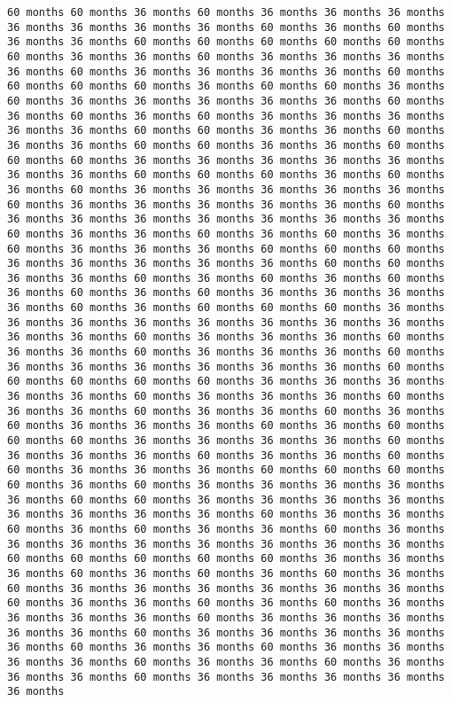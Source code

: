 \documentclass[11pt]{article}
\begin{document}
\begin{Verbatim}[commandchars=\\\{\}, frame=single, framerule=2mm, rulecolor=\color{outerrorbackground}]
60 months 60 months 36 months 60 months 36 months 36 months 36 months 36 months 36 months 36 months 36 months 60 months 36 months 60 months 36 months 36 months 60 months 60 months 60 months 60 months 60 months 60 months 36 months 36 months 60 months 36 months 36 months 36 months 36 months 60 months 36 months 36 months 36 months 36 months 60 months 60 months 60 months 60 months 36 months 60 months 60 months 36 months 60 months 36 months 36 months 36 months 36 months 36 months 60 months 36 months 60 months 36 months 60 months 36 months 36 months 36 months 36 months 36 months 60 months 60 months 36 months 36 months 60 months 36 months 36 months 60 months 60 months 36 months 36 months 60 months 60 months 60 months 36 months 36 months 36 months 36 months 36 months 36 months 36 months 60 months 60 months 60 months 36 months 60 months 36 months 60 months 36 months 36 months 36 months 36 months 36 months 60 months 36 months 36 months 36 months 36 months 36 months 60 months 36 months 36 months 36 months 36 months 36 months 36 months 36 months 60 months 36 months 36 months 60 months 36 months 60 months 36 months 60 months 36 months 36 months 36 months 60 months 60 months 60 months 36 months 36 months 36 months 36 months 36 months 60 months 60 months 36 months 36 months 60 months 36 months 60 months 36 months 60 months 36 months 60 months 36 months 60 months 36 months 36 months 36 months 36 months 60 months 36 months 60 months 60 months 60 months 36 months 36 months 36 months 36 months 36 months 36 months 36 months 36 months 36 months 36 months 60 months 36 months 36 months 36 months 60 months 36 months 36 months 60 months 36 months 36 months 36 months 60 months 36 months 36 months 36 months 36 months 36 months 36 months 60 months 60 months 60 months 60 months 60 months 36 months 36 months 36 months 36 months 36 months 60 months 36 months 36 months 36 months 60 months 36 months 36 months 60 months 36 months 36 months 60 months 36 months 60 months 36 months 36 months 36 months 60 months 36 months 60 months 60 months 60 months 36 months 36 months 36 months 36 months 60 months 36 months 36 months 36 months 60 months 36 months 36 months 60 months 60 months 36 months 36 months 36 months 60 months 60 months 60 months 60 months 36 months 60 months 36 months 36 months 36 months 36 months 36 months 60 months 60 months 36 months 36 months 36 months 36 months 36 months 36 months 36 months 36 months 60 months 36 months 36 months 60 months 36 months 60 months 36 months 36 months 60 months 36 months 36 months 36 months 36 months 36 months 36 months 36 months 36 months 60 months 60 months 60 months 60 months 60 months 36 months 36 months 36 months 60 months 36 months 60 months 36 months 60 months 36 months 60 months 36 months 36 months 36 months 36 months 36 months 36 months 60 months 36 months 36 months 60 months 36 months 60 months 36 months 36 months 36 months 36 months 60 months 36 months 36 months 36 months 36 months 36 months 60 months 36 months 36 months 36 months 36 months 36 months 60 months 36 months 36 months 60 months 36 months 36 months 36 months 36 months 60 months 36 months 36 months 60 months 36 months 36 months 36 months 60 months 36 months 36 months 36 months 36 months 36 months 
\end{Verbatim}
\end{document}
